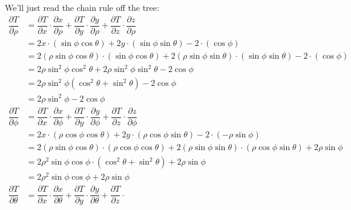 \begin{enumerate}[leftmargin=0pt]
\begin{enumerate}
        \begin{red}
        We'll just read the chain rule off the tree:
        \begin{align*}
            \dfrac{\partial T}{\partial\rho} &= 
            \dfrac{\partial T}{\partial x}\cdot
            \dfrac{\partial x}{\partial\rho}
            + 
            \dfrac{\partial T}{\partial y}\cdot
            \dfrac{\partial y}{\partial\rho}
            + 
            \dfrac{\partial T}{\partial z}\cdot
            \dfrac{\partial z}{\partial\rho} \\
            &= 2x\cdot(\sin\phi\cos\theta) 
            + 2y\cdot(\sin\phi\sin\theta)
            -2\cdot(\cos\phi) \\
            &= 2(\rho\sin\phi\cos\theta)\cdot(\sin\phi\cos\theta) 
            + 2(\rho\sin\phi\sin\theta)\cdot(\sin\phi\sin\theta)
            -2\cdot(\cos\phi) \\
            &= 2\rho\sin^2\phi\cos^2\theta + 2\rho\sin^2\phi\sin^2\theta - 2\cos\phi \\
            &= 2\rho\sin^2\phi(\cos^2\theta+\sin^2\theta) - 2\cos\phi \\
            &= 2\rho\sin^2\phi-2\cos\phi
            \\
            \dfrac{\partial T}{\partial\phi} &= 
            \dfrac{\partial T}{\partial x}\cdot
            \dfrac{\partial x}{\partial\phi}
            + 
            \dfrac{\partial T}{\partial y}\cdot
            \dfrac{\partial y}{\partial\phi}
            + 
            \dfrac{\partial T}{\partial z}\cdot
            \dfrac{\partial z}{\partial\phi} \\
            &= 2x\cdot(\rho\cos\phi\cos\theta)
            + 2y\cdot(\rho\cos\phi\sin\theta)
            -2  \cdot(-\rho\sin\phi) \\
            &= 2(\rho\sin\phi\cos\theta)\cdot(\rho\cos\phi\cos\theta)
            + 2(\rho\sin\phi\sin\theta)\cdot(\rho\cos\phi\sin\theta)
            +2  \rho\sin\phi \\
            &= 2\rho^2\sin\phi\cos\phi \cdot (\cos^2\theta + \sin^2 \theta) + 2\rho\sin\phi \\
            &= 2\rho^2\sin\phi\cos\phi + 2\rho\sin\phi
            \\
            \dfrac{\partial T}{\partial\theta} &= 
            \dfrac{\partial T}{\partial x}\cdot
            \dfrac{\partial x}{\partial\theta}
            + 
            \dfrac{\partial T}{\partial y}\cdot
            \dfrac{\partial y}{\partial\theta}
            + 
            \dfrac{\partial T}{\partial z}\cdot

\end{align*}
\end{red}
\end{enumerate}
\end{enumerate}
